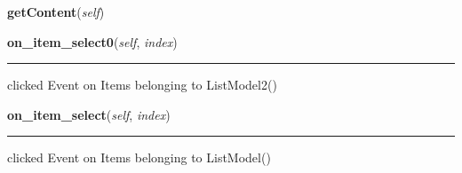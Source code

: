     \vspace{0.5ex}

\hspace{.8\funcindent}\begin{boxedminipage}{\funcwidth}

    \raggedright \textbf{getContent}(\textit{self})

\setlength{\parskip}{2ex}
\setlength{\parskip}{1ex}
    \end{boxedminipage}

    \label{GUI:main:Main:on_item_select0}

    \vspace{0.5ex}

\hspace{.8\funcindent}\begin{boxedminipage}{\funcwidth}

    \raggedright \textbf{on\_item\_select0}(\textit{self}, \textit{index})

    \vspace{-1.5ex}

    \rule{\textwidth}{0.5\fboxrule}
\setlength{\parskip}{2ex}
    clicked Event on Items belonging to ListModel2()

\setlength{\parskip}{1ex}
    \end{boxedminipage}

    \label{GUI:main:Main:on_item_select}

    \vspace{0.5ex}

\hspace{.8\funcindent}\begin{boxedminipage}{\funcwidth}

    \raggedright \textbf{on\_item\_select}(\textit{self}, \textit{index})

    \vspace{-1.5ex}

    \rule{\textwidth}{0.5\fboxrule}
\setlength{\parskip}{2ex}
    clicked Event on Items belonging to ListModel()

\setlength{\parskip}{1ex}
    \end{boxedminipage}

    \label{GUI:main:Main:setList2}

